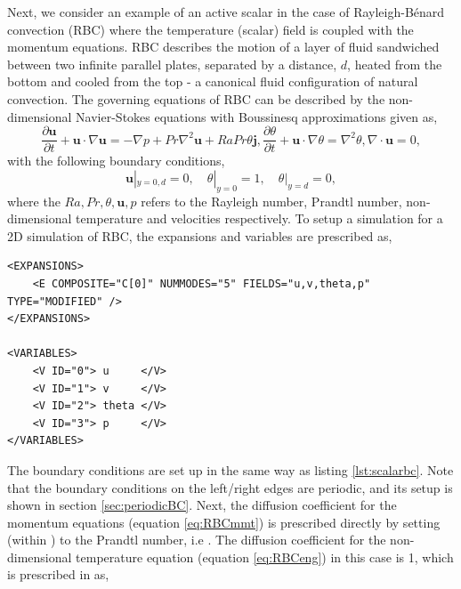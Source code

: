 Next, we consider an example of an active scalar in the case of Rayleigh-B\'{e}nard convection (RBC) where the temperature (scalar) field is coupled with the momentum equations. RBC describes the motion of a layer of fluid sandwiched between two infinite parallel plates, separated by a distance, $d$, heated from the bottom and cooled from the top - a canonical fluid configuration of natural convection. The governing equations of RBC can be described by the non-dimensional Navier-Stokes equations with Boussinesq approximations given as,
\begin{subequations}
    \begin{equation}\label{eq:RBCmmt}
        \frac{\partial \mathbf{u}}{\partial t} + \mathbf{u} \cdot \nabla \mathbf{u} = -\nabla p + Pr \nabla^2 \mathbf{u} + RaPr\theta \mathbf{j},
    \end{equation}

    \begin{equation}\label{eq:RBCeng}
        \frac{\partial \theta}{\partial t} + \mathbf{u} \cdot \nabla \theta = \nabla^2 \theta,
    \end{equation}

    \begin{equation}
    \nabla \cdot \mathbf{u} = 0,
    \end{equation}
\end{subequations}
with the following boundary conditions,
\begin{equation}
    \mathbf{u}|_{y=0,d} = 0, \quad \theta|_{y=0} = 1, \quad \theta|_{y=d} = 0, 
\end{equation}
where the $Ra, Pr, \theta, \mathbf{u}, p$ refers to the Rayleigh number, Prandtl number, non-dimensional temperature and velocities respectively.
To setup a simulation for a 2D simulation of RBC, the expansions and variables are prescribed as,
\begin{lstlisting}[style=XMLStyle]
<EXPANSIONS>
    <E COMPOSITE="C[0]" NUMMODES="5" FIELDS="u,v,theta,p" TYPE="MODIFIED" />
</EXPANSIONS>

<VARIABLES>
    <V ID="0"> u     </V>
    <V ID="1"> v     </V>
    <V ID="2"> theta </V>
    <V ID="3"> p     </V>
</VARIABLES>
\end{lstlisting}
The boundary conditions are set up in the same way as listing \ref{lst:scalarbc}.
Note that the boundary conditions on the left/right edges are periodic, and its setup is shown in section \ref{sec:periodicBC}.
Next, the diffusion coefficient for the momentum equations (equation \ref{eq:RBCmmt}) is prescribed directly by setting  (within ) to the Prandtl number, i.e .
The diffusion coefficient for the non-dimensional temperature equation (equation \ref{eq:RBCeng}) in this case is 1, which is prescribed in  as,

